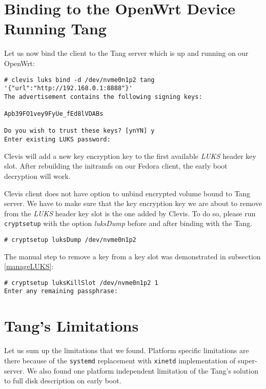 \section{Binding to the OpenWrt Device Running Tang}
Let us now bind the client to the Tang server which is up and running on our OpenWrt:
\begin{lstlisting}[columns=fixed,basicstyle=\ttfamily\footnotesize,tabsize=4,backgroundcolor=\color{yellow!10}]
# clevis luks bind -d /dev/nvme0n1p2 tang '{"url":"http://192.168.0.1:8888"}'
The advertisement contains the following signing keys:

Apb39FO1vey9FyUe_fEd8lVDABs

Do you wish to trust these keys? [ynYN] y
Enter existing LUKS password:
\end{lstlisting}
Clevis will add a new key encryption key to the first available {\it LUKS} header key slot.
After rebuilding the initramfs on our Fedora client, the early boot decryption will work.

Clevis client does not have option to unbind encrypted volume bound to Tang server.
We have to make sure that the key encryption key we are about to remove from the {\it LUKS} header key slot is the one added by Clevis.
To do so, please run {\tt cryptsetup} with the option {\it luksDump} before and after binding with the Tang.
\begin{lstlisting}[columns=fixed,basicstyle=\ttfamily\footnotesize,tabsize=4,backgroundcolor=\color{yellow!10}]
# cryptsetup luksDump /dev/nvme0n1p2
\end{lstlisting}
The manual step to remove a key from a key slot was demonstrated in subsection \ref{manageLUKS}:
\begin{lstlisting}[columns=fixed,basicstyle=\ttfamily\footnotesize,tabsize=4,backgroundcolor=\color{yellow!10}]
# cryptsetup luksKillSlot /dev/nvme0n1p2 1
Enter any remaining passphrase:
\end{lstlisting}

\section{Tang's Limitations}\label{limitations}

Let us sum up the limitations that we found.
Platform specific limitations are there because of the {\tt systemd} replacement with {\tt xinetd} implementation of super-server.
We also found one platform independent limitation of the Tang's solution to full disk description on early boot.

